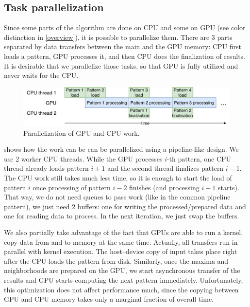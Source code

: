 \subsection{Task parallelization}

Since some parts of the algorithm are done on CPU and some on GPU (see color distinction in \cref{overview}), it is possible to parallelize them. There are 3 parts separated by data transfers between the main and the GPU memory: CPU first loads a pattern, GPU processes it, and then CPU does the finalization of results. It is desirable that we parallelize those tasks, so that GPU is fully utilized and never waits for the CPU.

\begin{figure}
	\centering
	\includegraphics[width=\textwidth]{img/CPUGPUparal}
	\caption{Parallelization of GPU and CPU work.}
	\label{pipeline}
\end{figure}

 shows how the work can be can be parallelized using a pipeline-like design. We use 2 worker CPU threads. While the GPU processes $i$-th pattern, one CPU thread already loads pattern $i+1$ and the second thread finalizes pattern $i-1$. The CPU work still takes much less time, so it is enough to start the load of pattern $i$ once processing of pattern $i-2$ finishes (and processing $i-1$ starts). That way, we do not need queues to pass work (like in the common pipeline pattern), we just need 2 buffers: one for writing the processed/prepared data and one for reading data to process. In the next iteration, we just swap the buffers.

We also partially take advantage of the fact that GPUs are able to run a kernel, copy data from and to memory at the same time. Actually, all transfers run in parallel with kernel execution. The host--device copy of input takes place right after the CPU loads the pattern from disk. Similarly, once the maxima and neighborhoods are prepared on the GPU, we start asynchronous transfer of the results and GPU starts computing the next pattern immediately. Unfortunately, this optimization does not affect performance much, since the copying between GPU and CPU memory takes only a marginal fraction of overall time.

